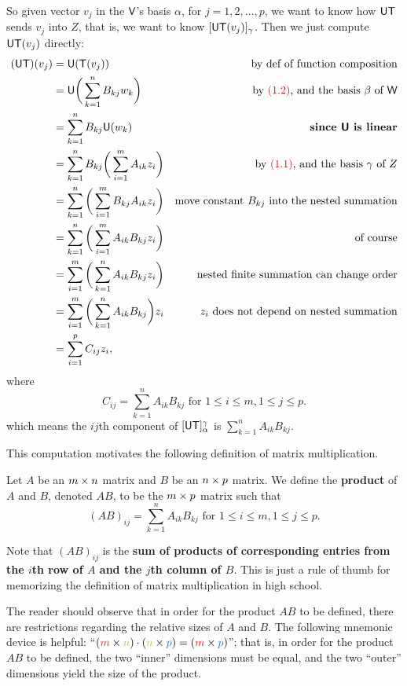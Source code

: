 So given vector \(v_j\) in the \(\textsf{V}\)'s basis \(\alpha\), for \(j = 1, 2, ..., p\), we want to know how \(\textsf{U}\textsf{T}\) sends \(v_j\) into \(Z\), that is, we want to know \([\textsf{U}\textsf{T}(v_j)]_{\gamma}\).
Then we just compute \(\textsf{U}\textsf{T}(v_j)\) directly:
\begin{align*}
    (\U\T)(v_j) & = \U(\T(v_j)) & \text{by def of function composition} \\
                & = \U \bigg( \sum_{k = 1}^{n} B_{kj} w_k \bigg) & \text{by \MAROON{(1.2)}, and the basis \(\beta\) of \(\W\)} \\
                & = \sum_{k = 1}^n B_{kj} \U(w_k) & \text{\textbf{since \(\U\) is linear}} \\
                & = \sum_{k = 1}^n B_{kj} \bigg( \sum_{i = 1}^m A_{ik} z_i \bigg) & \text{by \MAROON{(1.1)}, and the basis \(\gamma\) of \(Z\)} \\
                & = \sum_{k = 1}^n \bigg( \sum_{i = 1}^m B_{kj} A_{ik} z_i \bigg) & \text{move constant \(B_{kj}\) into the nested summation} \\
                & = \sum_{k = 1}^n \bigg( \sum_{i = 1}^m A_{ik} B_{kj} z_i \bigg) & \text{of course} \\
                & = \sum_{i = 1}^m \bigg( \sum_{k = 1}^n A_{ik} B_{kj} z_i \bigg) & \text{nested finite summation can change order} \\
                & = \sum_{i = 1}^m \bigg( \sum_{k = 1}^n A_{ik} B_{kj} \bigg) z_i & \text{\(z_i\) does not depend on nested summation} \\
                & = \sum_{i = 1}^p C_{ij} z_i,
\end{align*}
where
\[
    C_{ij} = \sum_{k = 1}^n A_{ik} B_{kj} \text{ for } 1 \le i \le m, 1 \le j \le p.
\]
which means the \(ij\)th component of \([\textsf{U}\textsf{T}]_{\alpha}^{\gamma}\) is \(\sum_{k = 1}^n A_{ik} B_{kj}\).

This computation motivates the following definition of matrix multiplication. \begin{definition} \label{def 2.10}
Let \(A\) be an \(m \times n\) matrix and \(B\) be an \(n \times p\) matrix. 
We define the \textbf{product} of \(A\) and \(B\), denoted \(AB\), to be the \(m \times p\) matrix such that
\[
    (AB)_{ij} = \sum_{k = 1}^n A_{ik} B_{kj} \text{ for } 1 \le i \le m, 1 \le j \le p.
\]
\end{definition}

\begin{remark} \label{remark 2.3.2}
Note that \((AB)_{ij}\) is the \textbf{sum of products of corresponding entries from the \(i\)th row of \(A\) and the \(j\)th column of \(B\)}.
This is just a rule of thumb for memorizing the definition of matrix multiplication in high school.

The reader should observe that in order for the product \(AB\) to be defined, there are restrictions regarding the relative sizes of \(A\) and \(B\).
The following mnemonic device is helpful: ``\((\RED{m} \X \GREEN{n}) \cdot (\GREEN{n} \X \BLUE{p}) = (\RED{m} \X \BLUE{p})\)'';
that is, in order for the product \(AB\) to be defined, the two ``inner'' dimensions must be equal, and the two ``outer'' dimensions yield the size of the product.
\end{remark}

